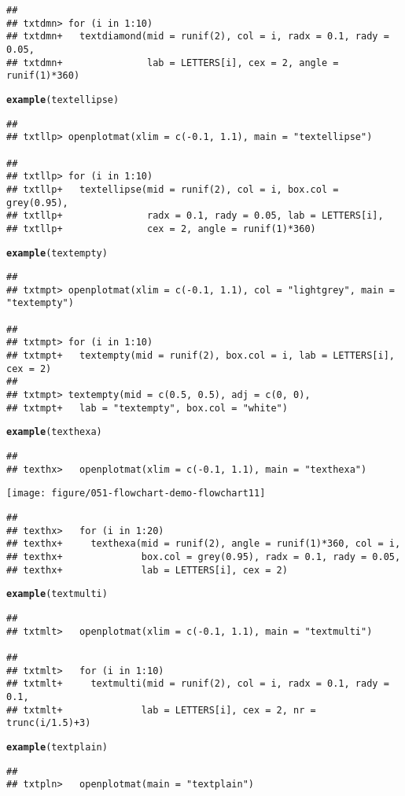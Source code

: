 \documentclass{article}\usepackage{graphicx, color}
\makeatletter
\def\maxwidth{ %
  \ifdim\Gin@nat@width>\linewidth
    \linewidth
  \else
    \Gin@nat@width
  \fi
}
\newcommand{\hlfunctioncall}[1]{\textcolor[rgb]{0.501960784313725,0,0.329411764705882}{\textbf{#1}}}%
\newenvironment{kframe}{%
 \def\at@end@of@kframe{}%
 \ifinner\ifhmode%
  \def\at@end@of@kframe{\end{minipage}}%
  \begin{minipage}{\columnwidth}%
 \fi\fi%
 \def\FrameCommand##1{\hskip\@totalleftmargin \hskip-\fboxsep
 \colorbox{shadecolor}{##1}\hskip-\fboxsep
     \hskip-\linewidth \hskip-\@totalleftmargin \hskip\columnwidth}%
 \MakeFramed {\advance\hsize-\width
   \@totalleftmargin\z@ \linewidth\hsize
   \@setminipage}}%
 {\par\unskip\endMakeFramed%
 \at@end@of@kframe}
\newenvironment{knitrout}{}{} %
\makeatother
\begin{document}
\begin{knitrout}
\begin{kframe}
\begin{verbatim}
## 
## txtdmn> for (i in 1:10) 
## txtdmn+   textdiamond(mid = runif(2), col = i, radx = 0.1, rady = 0.05,
## txtdmn+               lab = LETTERS[i], cex = 2, angle = runif(1)*360)
\end{verbatim}
\begin{alltt}
\hlfunctioncall{example}(textellipse)
\end{alltt}
\begin{verbatim}
## 
## txtllp> openplotmat(xlim = c(-0.1, 1.1), main = "textellipse")

## 
## txtllp> for (i in 1:10) 
## txtllp+   textellipse(mid = runif(2), col = i, box.col = grey(0.95),
## txtllp+               radx = 0.1, rady = 0.05, lab = LETTERS[i],
## txtllp+               cex = 2, angle = runif(1)*360)
\end{verbatim}
\begin{alltt}
\hlfunctioncall{example}(textempty)
\end{alltt}
\begin{verbatim}
## 
## txtmpt> openplotmat(xlim = c(-0.1, 1.1), col = "lightgrey", main = "textempty")

## 
## txtmpt> for (i in 1:10) 
## txtmpt+   textempty(mid = runif(2), box.col = i, lab = LETTERS[i], cex = 2)
## 
## txtmpt> textempty(mid = c(0.5, 0.5), adj = c(0, 0), 
## txtmpt+   lab = "textempty", box.col = "white")
\end{verbatim}
\begin{alltt}
\hlfunctioncall{example}(texthexa)
\end{alltt}
\begin{verbatim}
## 
## texthx>   openplotmat(xlim = c(-0.1, 1.1), main = "texthexa")
\end{verbatim}
\end{kframe}
\texttt{[image: figure/051-flowchart-demo-flowchart11]} 
\begin{kframe}\begin{verbatim}
## 
## texthx>   for (i in 1:20) 
## texthx+     texthexa(mid = runif(2), angle = runif(1)*360, col = i,
## texthx+              box.col = grey(0.95), radx = 0.1, rady = 0.05,
## texthx+              lab = LETTERS[i], cex = 2)
\end{verbatim}
\begin{alltt}
\hlfunctioncall{example}(textmulti)
\end{alltt}
\begin{verbatim}
## 
## txtmlt>   openplotmat(xlim = c(-0.1, 1.1), main = "textmulti")

## 
## txtmlt>   for (i in 1:10) 
## txtmlt+     textmulti(mid = runif(2), col = i, radx = 0.1, rady = 0.1,
## txtmlt+              lab = LETTERS[i], cex = 2, nr = trunc(i/1.5)+3)
\end{verbatim}
\begin{alltt}
\hlfunctioncall{example}(textplain)
\end{alltt}
\begin{verbatim}
## 
## txtpln>   openplotmat(main = "textplain")


\end{verbatim}
\end{kframe}
\end{knitrout}
\end{document}
